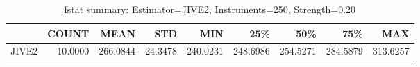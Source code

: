 \begin{table}[ht]
\centering
\caption{fstat summary: Estimator=JIVE2, Instruments=250, Strength=0.20}
\begin{tabular}{lrrrrrrrr}
\toprule
 & COUNT & MEAN & STD & MIN & 25\% & 50\% & 75\% & MAX \\
\midrule
JIVE2 & 10.0000 & 266.0844 & 24.3478 & 240.0231 & 248.6986 & 254.5271 & 284.5879 & 313.6257 \\
\bottomrule
\end{tabular}
\end{table}
